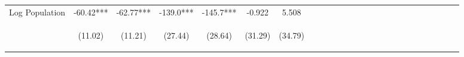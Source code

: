 \documentclass[]{article}
\begin{document}
\begin{center}
\begin{tabular}{lcccccccccccccccccccccccc}
Log Population & -60.42*** & -62.77*** & -139.0*** & -145.7*** & -0.922 & 5.508 &  &  &  &  &  &  &  &  &  &  &  &  &  &  &  &  &  &  \\
\vspace{4pt} & \begin{footnotesize}(11.02)\end{footnotesize} & \begin{footnotesize}(11.21)\end{footnotesize} & \begin{footnotesize}(27.44)\end{footnotesize} & \begin{footnotesize}(28.64)\end{footnotesize} & \begin{footnotesize}(31.29)\end{footnotesize} & \begin{footnotesize}(34.79)\end{footnotesize} & \begin{footnotesize}\end{footnotesize} & \begin{footnotesize}\end{footnotesize} & \begin{footnotesize}\end{footnotesize} & \begin{footnotesize}\end{footnotesize} & \begin{footnotesize}\end{footnotesize} & \begin{footnotesize}\end{footnotesize} & \begin{footnotesize}\end{footnotesize} & \begin{footnotesize}\end{footnotesize} & \begin{footnotesize}\end{footnotesize} & \begin{footnotesize}\end{footnotesize} & \begin{footnotesize}\end{footnotesize} & \begin{footnotesize}\end{footnotesize} & \begin{footnotesize}\end{footnotesize} & \begin{footnotesize}\end{footnotesize} & \begin{footnotesize}\end{footnotesize} & \begin{footnotesize}\end{footnotesize} & \begin{footnotesize}\end{footnotesize} & \begin{footnotesize}\end{footnotesize} \\

\end{tabular}
\end{center}
\end{document}
